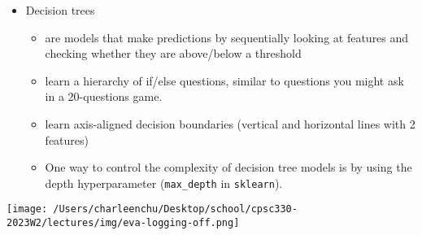 \documentclass[11pt]{article}
\providecommand{\tightlist}{%
      \setlength{\itemsep}{0pt}\setlength{\parskip}{0pt}}
\begin{document}
    \begin{itemize}
\tightlist
\item
  Decision trees

  \begin{itemize}
  \tightlist
  \item
    are models that make predictions by sequentially looking at features
    and checking whether they are above/below a threshold
  \item
    learn a hierarchy of if/else questions, similar to questions you
    might ask in a 20-questions game.\\
  \item
    learn axis-aligned decision boundaries (vertical and horizontal
    lines with 2 features)\\
  \item
    One way to control the complexity of decision tree models is by
    using the depth hyperparameter (\texttt{max\_depth} in
    \texttt{sklearn}).
  \end{itemize}
\end{itemize}

    

    \texttt{[image: /Users/charleenchu/Desktop/school/cpsc330-2023W2/lectures/img/eva-logging-off.png]}


    
    
    
\end{document}
